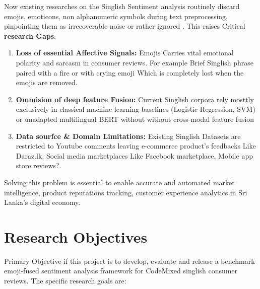 \documentclass[conference]{IEEEtran}
\begin{document}
Now existing researches on the Singlish Sentiment analysis routinely discard
emojis, emoticons, non alphanumeric symbols during text preprocessing,
pinpointing them as irrecoverable noise or rather ignored
\cite{uthpala2024sinhala,desilva2019survey}. This raises Critical
\textbf{research Gaps}:

\begin{enumerate}
      \item \textbf{Loss of essential Affective Signals:}
            Emojis Carries vital emotional polarity and sarcasm in consumer reviews. For example Brief
            Singlish phrase paired with a fire  or with crying emoji 
            Which is completely lost when the emojis are removed.
      \item \textbf{Ommision of deep feature Fusion:}
            Current Singlish corpora rely mosttly exclusively in classical machine learning baselines
            (Logistic Regression, SVM) \cite{uthpala2024sinhala} or unadapted multilingual BERT without without
            cross-modal feature fusion \cite{chakravarthi2020corpus}
      \item \textbf{Data sourfce \& Domain Limitations:} Existing Singlish Datasets are restricted to Youtube
            comments \cite{uthpala2024sinhala} leaving e-commerce product's feedbacks Like Daraz.lk, Social media
            marketplaces Like Facebook marketplace, Mobile app store reviews?.
\end{enumerate}

Solving this problem is essential to enable accurate and automated market
intelligence, product reputations tracking, customer experience analytics in
Sri Lanka's digital economy.

\section{Research Objectives}
Primary Objective if this project is to develop, evaluate and release a
benchmark emoji-fused sentiment analysis framework for CodeMixed singlish
consumer reviews. The specific research goals are:
\end{document}
